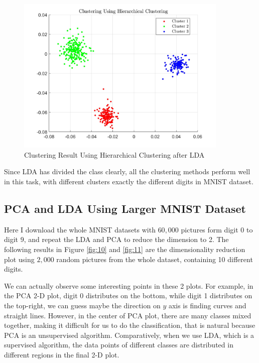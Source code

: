 \documentclass[a4paper,12pt]{article} %
\begin{document}
\begin{figure}[!htbp]
	\centering
	\includegraphics[width=0.9\textwidth]{HIERACHICAL2.jpg}
	\caption{Clustering Result Using Hierarchical Clustering after LDA}
	\label{fig:9}
\end{figure}

\hspace{0.7cm}
Since LDA has divided the class clearly, all the clustering methods perform well in this task, with different clusters exactly the different digits in MNIST dataset.

\subsection{PCA and LDA Using Larger MNIST Dataset}
\hspace{0.7cm}
Here I download the whole MNIST datasets with $60,000$ pictures form digit 0 to digit 9, and repeat the LDA and PCA to reduce the dimension to 2. The following results in Figure \ref{fig:10} and \ref{fig:11} are the dimensionality reduction plot using $2,000$ random pictures from the whole dataset, containing 10 different digits.

\hspace{0.7cm}
We can actually observe some interesting points in these 2 plots. For example, in the PCA 2-D plot, digit 0 distributes on the bottom, while digit 1 distributes on the top-right, we can guess maybe the direction on $y$ axis is finding curves and straight lines. However, in the center of PCA plot, there are many classes mixed together, making it difficult for us to do the classification, that is natural because PCA is an unsupervised algorithm. Comparatively, when we use LDA, which is a supervised algorithm, the data points of different classes are distributed in different regions in the final 2-D plot.
\end{document}
